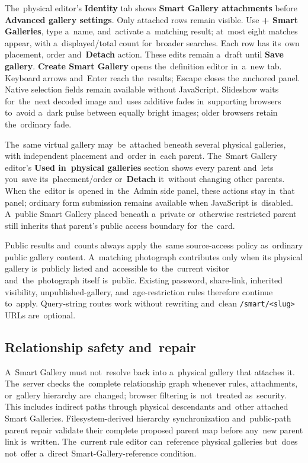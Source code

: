 \documentclass[11pt,a4paper]{article}
\newcommand{\ui}[1]{\textbf{#1}}
\begin{document}
The~physical editor's \ui{Identity} tab shows \ui{Smart Gallery attachments}
before \ui{Advanced gallery settings}. Only attached rows remain visible.
Use \ui{+ Smart Galleries}, type a~name, and~activate a~matching result;
at~most eight matches appear, with a~displayed/total count for~broader searches.
Each row has its~own placement, order and~\ui{Detach} action.
These edits remain a~draft until \ui{Save gallery}. \ui{Create Smart Gallery}
opens the~definition editor in~a~new tab. Keyboard arrows and~Enter
reach the~results; Escape closes the~anchored panel. Native selection fields
remain available without JavaScript. Slideshow waits for~the~next decoded
image and~uses additive fades in~supporting browsers to~avoid a~dark pulse
between equally bright images; older browsers retain the~ordinary fade.

The~same virtual gallery may~be~attached beneath several physical galleries,
with independent placement and~order in~each parent. The~Smart Gallery editor's
\ui{Used in~physical galleries} section shows every parent and~lets you~save
its~placement/order or~\ui{Detach} it~without changing other parents. When
the~editor is~opened in~the~Admin side panel, these actions stay in~that panel;
ordinary form submission remains available when JavaScript is~disabled. A~public
Smart Gallery placed beneath a~private or~otherwise restricted parent still
inherits that parent's public access boundary for~the~card.

Public results and~counts always apply the~same source-access policy as~ordinary
public gallery content. A~matching photograph contributes only when its physical
gallery is~publicly listed and~accessible to~the~current visitor
and~the~photograph itself is~public. Existing password, share-link, inherited
visibility, unpublished-gallery, and~age-restriction rules therefore continue
to~apply. Query-string routes work without rewriting and~clean
\texttt{/smart/<slug>} URLs are~optional.

\subsection{Relationship safety and~repair}

A~Smart Gallery must not~resolve back into a~physical gallery that attaches it.
The~server checks the~complete relationship graph whenever rules, attachments,
or~gallery hierarchy are~changed; browser filtering is~not~treated as~security.
This includes indirect paths through physical descendants and~other attached
Smart Galleries. Filesystem-derived hierarchy synchronization and~public-path
parent repair validate their complete proposed parent map before any~new parent
link is~written. The~current rule editor can~reference physical galleries
but~does not~offer a~direct Smart-Gallery-reference condition.
\end{document}
